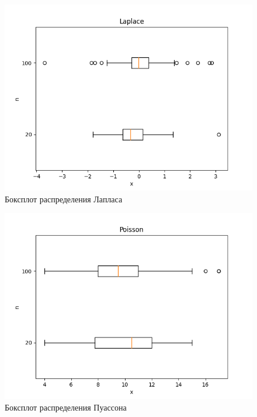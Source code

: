 \begin{figure}[H]
	\centering
	\includegraphics[scale=0.65]{laplace_boxplot.png}
	\caption{Боксплот распределения Лапласа}
\end{figure}

\begin{figure}[H]
	\centering
	\includegraphics[scale=0.65]{poisson_boxplot.png}
	\caption{Боксплот распределения Пуассона}
\end{figure}

